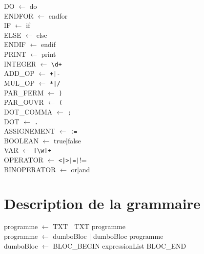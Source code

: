 ﻿\documentclass{report}
\begin{document}
DO $\leftarrow$ do\\

ENDFOR $\leftarrow$ endfor\\

IF $\leftarrow$ if\\

ELSE $\leftarrow$ else\\

ENDIF $\leftarrow$ endif\\

PRINT $\leftarrow$ print\\

INTEGER $\leftarrow$ \verb!\d+!\\

ADD\_OP $\leftarrow$ \verb!+|-!\\

MUL\_OP $\leftarrow$ \verb!*|/!\\

PAR\_FERM $\leftarrow$ \verb!)!\\

PAR\_OUVR $\leftarrow$ \verb!(!\\

DOT\_COMMA $\leftarrow$ \verb!;!\\

DOT $\leftarrow$ \verb!.!\\

ASSIGNEMENT $\leftarrow$ \verb!:=!\\

BOOLEAN $\leftarrow$ true|false\\

VAR $\leftarrow$ \verb![\w]+!\\

OPERATOR $\leftarrow$ \verb!<|>|=|!!=\\

BINOPERATOR $\leftarrow$ or|and\\



\section*{ Description de la grammaire}

programme $\leftarrow$ TXT | TXT programme\\

programme $\leftarrow$ dumboBloc | dumboBloc programme\\

dumboBloc $\leftarrow$ BLOC\_BEGIN expressionList BLOC\_END\\
\end{document}
